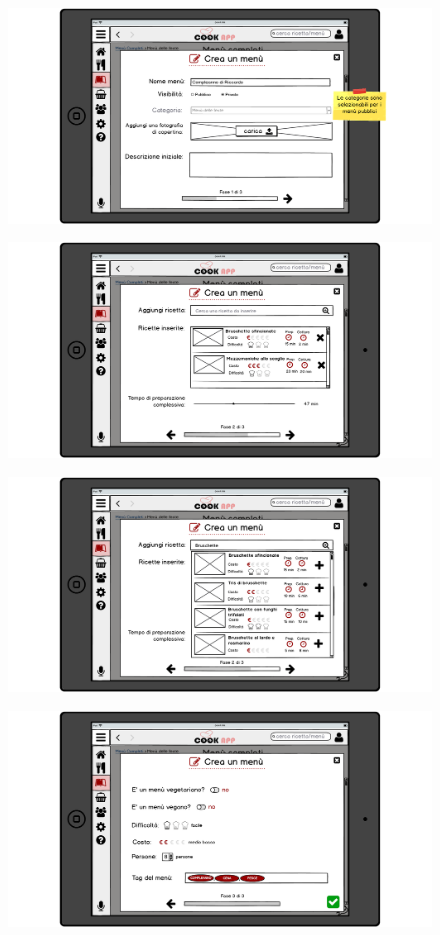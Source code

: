 \begin{itemize}
\begin{figure}[H]
	\centering
	\includegraphics[width=0.95\linewidth]{img/mockup/menu-crea.png}
\end{figure}
\begin{figure}[H]
	\centering
	\includegraphics[width=0.95\linewidth]{img/mockup/menu-crea-2.png}
\end{figure}
\begin{figure}[H]
	\centering
	\includegraphics[width=0.95\linewidth]{img/mockup/menu-crea-3.png}
\end{figure}
\begin{figure}[H]
	\centering
	\includegraphics[width=0.95\linewidth]{img/mockup/menu-crea-4.png}

\end{figure}
\end{itemize}
